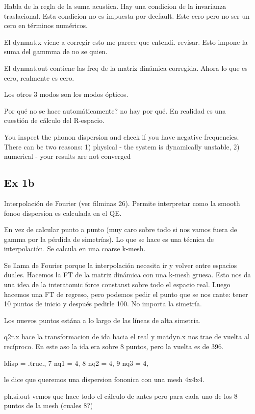   Habla de la regla de la suma acustica. Hay una condicion de la invarianza traslacional. Esta condicion no es impuesta por deefault. Este cero  pero no ser un cero en términos numéricos.

  El dynmat.x viene a corregir esto me parece que entendi. revisar. Esto impone la suma del gammma de no se quien.

  El dynmat.out contiene las freq de la matriz dinámica corregida. Ahora lo que es cero, realmente es cero.

  Los otros 3 modos son los modos ópticos.

  Por qué no se hace automáticamente? no hay por qué. En realidad es una cuestión de cálculo del R-espacio.


  You inspect the phonon dispersion and check if you have negative frequencies. There can be two reasons: 1) physical - the system is dynamically unstable, 2) numerical - your results are not converged


\subsection{Ex 1b}

  Interpolación de Fourier (ver filminas 26). Permite interpretar como la smooth fonoo dispersion es calculada en el QE.

  En vez de calcular punto a punto (muy caro sobre todo si nos vamos fuera de gamma por la pérdida de simetrías). Lo que se hace es una técnica de interpolación. Se calcula en una coarse k-mesh.

  Se llama de Fourier porque la interpolación necesita ir y volver entre espacios duales. Hacemos la FT de la matriz dinámica con una k-mesh gruesa. Esto nos da una idea de la interatomic force constanst sobre todo el espacio real. Luego hacemos una FT de regreso, pero podemos pedir el punto que se nos cante: tener 10 puntos de inicio y después pedirle 100. No importa la simetría.

  Los nuevos puntos estána a lo largo de las líneas de alta simetría.

  q2r.x hace la transformacion de ida hacia el real y matdyn.x nos trae de vuelta al recíproco. En este aso la ida era sobre 8 puntos, pero la vuelta es de 396.

  ldisp = .true.,
  7   nq1 = 4,
  8   nq2 = 4,
  9   nq3 = 4,

  le dice que queremos una dispersion fononica con una mesh 4x4x4.

    ph.si.out vemos que hace todo el cálculo de antes pero para cada uno de los 8 puntos de la mesh (cuales 8?)

